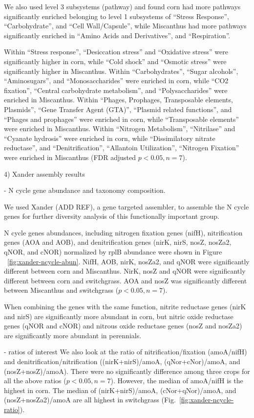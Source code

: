 \documentclass[12pt]{article}
\begin{document}
We also used level 3 subsystems (pathway) and found corn had more pathways significantly enriched belonging to level 1 subsystems of ``Stress Response'', ``Carbohydrate'', and ``Cell Wall/Capsule'', while Miscanthus had more pathways significantly enriched in ``Amino Acids and Derivatives'', and ``Respiration''.

Within ``Stress response'', ``Desiccation stress'' and  ``Oxidative stress'' were significantly higher in corn, while ``Cold shock'' and ``Osmotic stress'' were significantly higher in Miscanthus. Within ``Carbohydrates'', ``Sugar alcohols'', ``Aminosugars'', and ``Monosaccharides'' were enriched in corn, while ``CO2 fixation'', ``Central carbohydrate metabolism'', and ``Polysaccharides'' were enriched in Miscanthus. Within ``Phages, Prophages, Transposable elements, Plasmids'', ``Gene Transfer Agent (GTA)'', ``Plasmid related functions'', and ``Phages and prophages'' were enriched in corn, while ``Transposable elements'' were enriched in Miscanthus. Within ``Nitrogen Metabolism'', ``Nitrilase'' and ``Cyanate hydrosis'' were enriched in corn, while ``Dissimilatory nitrate reductase'', and ``Denitrification'', ``Allantoin Utilization'', ``Nitrogen Fixation''  were enriched in Miscanthus (FDR adjusted $p < 0.05, n = 7$).

4) Xander assembly results

- N cycle gene abundance and taxonomy composition.

We used Xander (ADD REF), a gene targeted assembler, to assemble the N cycle genes for further diversity analysis of this functionally important group.

N cycle genes abundances, including nitrogen fixation genes (nifH), nitrification genes (AOA and AOB), and denitrification genes (nirK, nirS, nosZ, nosZa2, qNOR, and cNOR) normalized by rplB abundance were shown in Figure ~\ref{fig:xander-ncycle-abun}. NifH, AOB, nirK, nosZa2, and qNOR were significantly different between corn and Miscanthus. NirK, nosZ and qNOR  were significantly different between corn and switchgrass. AOA and nosZ was significantly different between Miscanthus and switchgrass ($p < 0.05, n = 7$).

When combining the genes with the same function, nitrite reductase genes (nirK and nirS) are significantly more abundant in corn, but nitric oxide reductase genes (qNOR and cNOR) and nitrous oxide reductase genes (nosZ and nosZa2) are significantly more abundant in perennials.

- ratios of interest
We also look at the ratio of nitrification/fixation (amoA/nifH) and denitrification/nitrification ((nirK+nirS)/amoA, (qNor+cNor)/amoA, and (nosZ+nosZ)/amoA). There were no significantly difference among three crops for all the above ratios ($p < 0.05, n = 7$). However, the median of amoA/nifH is the highest in corn. The median of (nirK+nirS)/amoA, (cNor+qNor)/amoA, and (nosZ+nosZa2)/amoA are all highest in switchgrass (Fig.~\ref{fig:xander-ncycle-ratio}).
\end{document}
